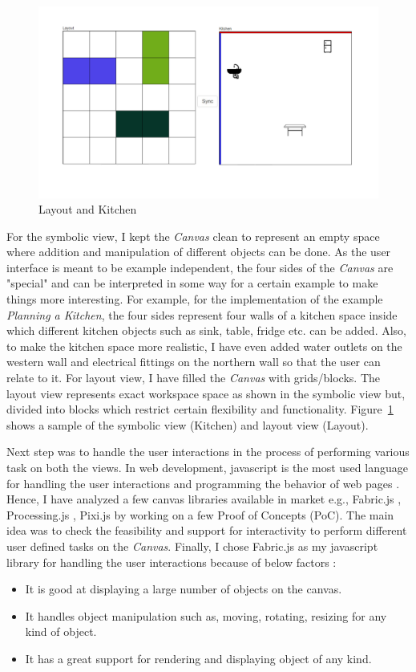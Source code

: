 \begin{figure}
	\includegraphics[width=1\textwidth]{figures/Layout_Kitchen}
	\caption{Layout and Kitchen}
	\label{fig:Layout_Kitchen}
\end{figure}

For the symbolic view, I kept the \textit{Canvas} clean to represent an empty space where addition and manipulation of different objects can be done. As the user interface is meant to be example independent, the four sides of the \textit{Canvas} are "special" and can be interpreted in some way for a certain example to make things more interesting. For example, for the implementation of the example \textit{Planning a Kitchen}, the four sides represent four walls of a kitchen space inside which different kitchen objects such as sink, table, fridge etc. can be added. Also, to make the kitchen space more realistic, I have even added {\color{blue} water outlets} on the western wall and {\color{red} electrical fittings} on the northern wall so that the user can relate to it. For layout view, I have filled the \textit{Canvas} with grids/blocks. The layout view represents exact workspace space as shown in the symbolic view but, divided into blocks which restrict certain flexibility and functionality. Figure~\ref{fig:Layout_Kitchen} shows a sample of the symbolic view (Kitchen) and layout view (Layout).

Next step was to handle the user interactions in the process of performing various task on both the views. In web development, javascript is the most used language for handling the user interactions and programming the behavior of web pages \cite{javascript}. Hence, I have analyzed a few canvas libraries available in market e.g., Fabric.js \cite{fabricjs}, Processing.js \cite{processingjs}, Pixi.js \cite{pixijs}  by working on a few Proof of Concepts (PoC). The main idea was to check the feasibility and support for interactivity to perform different user defined tasks on the \textit{Canvas}. Finally, I chose Fabric.js as my javascript library for handling the user interactions because of below factors \cite{fabricjs}:
\begin{itemize}
	\item {It is good at displaying a large number of objects on the canvas.}
	\item {It handles object manipulation such as, moving, rotating, resizing for any kind of object.}
	\item {It has a great support for rendering and displaying object of any kind.}
\end{itemize}

